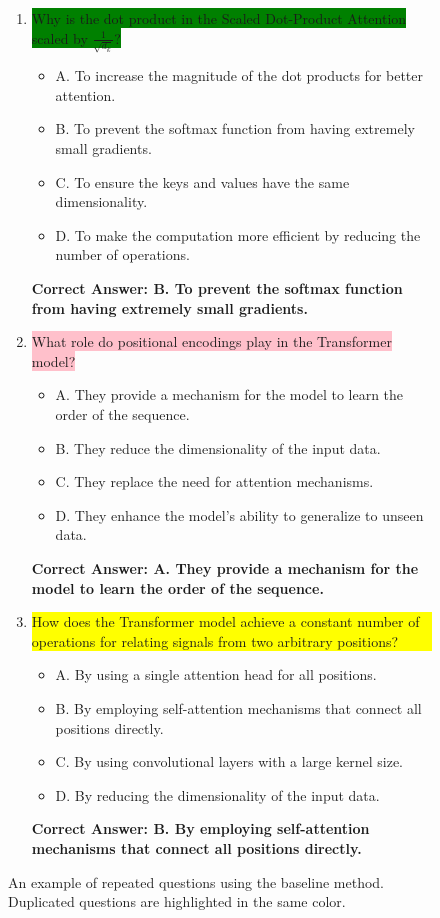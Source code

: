 \begin{figure*}
\begin{tcolorbox}[width=\textwidth,fontupper=\footnotesize,title=Repeated Baseline Questions - Continued]
\begin{enumerate}
    \item \colorbox{green}{Why is the dot product in the Scaled Dot-Product Attention scaled by \( \frac{1}{\sqrt{d_k}} \)?}
    \begin{itemize}
        \item A. To increase the magnitude of the dot products for better attention.
        \item B. To prevent the softmax function from having extremely small gradients.
        \item C. To ensure the keys and values have the same dimensionality.
        \item D. To make the computation more efficient by reducing the number of operations.
    \end{itemize}
    \textbf{Correct Answer: B. To prevent the softmax function from having extremely small gradients.}

    \item \colorbox{pink}{What role do positional encodings play in the Transformer model?}
    \begin{itemize}
        \item A. They provide a mechanism for the model to learn the order of the sequence.
        \item B. They reduce the dimensionality of the input data.
        \item C. They replace the need for attention mechanisms.
        \item D. They enhance the model's ability to generalize to unseen data.
    \end{itemize}
    \textbf{Correct Answer: A. They provide a mechanism for the model to learn the order of the sequence.}

    \item \colorbox{yellow}{\parbox{0.93\textwidth}{How does the Transformer model achieve a constant number of operations for relating signals from two arbitrary positions?}}
    \begin{itemize}
        \item A. By using a single attention head for all positions.
        \item B. By employing self-attention mechanisms that connect all positions directly.
        \item C. By using convolutional layers with a large kernel size.
        \item D. By reducing the dimensionality of the input data.
    \end{itemize}
    \textbf{Correct Answer: B. By employing self-attention mechanisms that connect all positions directly.}
\end{enumerate}
\end{tcolorbox}
\caption{An example of repeated questions using the baseline method. Duplicated questions are highlighted in the same color.}
\label{fig:baseline_repeat_example}
\end{figure*}